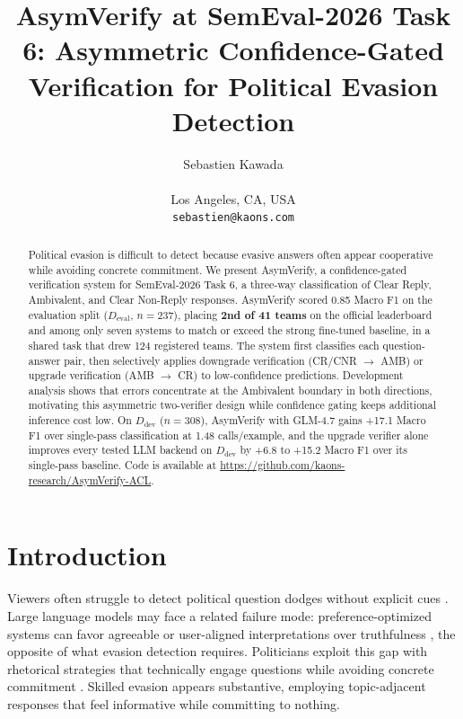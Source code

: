 \documentclass[11pt]{article}
\title{AsymVerify at SemEval-2026 Task 6: Asymmetric Confidence-Gated Verification for Political Evasion Detection}
\author{Sebastien Kawada \\
  \kaonslink \\
  Los Angeles, CA, USA \\
  \texttt{sebastien@kaons.com}}
\newcommand{\rev}[1]{#1}
\begin{document}
\maketitle

\begin{abstract}
\rev{Political evasion is difficult to detect because evasive answers often appear cooperative while avoiding concrete commitment. We present AsymVerify, a confidence-gated verification system for SemEval-2026 Task 6, a three-way classification of Clear Reply, Ambivalent, and Clear Non-Reply responses. AsymVerify scored 0.85 Macro F1 on the evaluation split ($D_{\text{eval}}$, $n{=}237$), placing \textbf{2nd of 41 teams} on the official leaderboard and among only seven systems to match or exceed the strong fine-tuned baseline, in a shared task that drew 124 registered teams. The system first classifies each question-answer pair, then selectively applies downgrade verification (CR/CNR $\rightarrow$ AMB) or upgrade verification (AMB $\rightarrow$ CR) to low-confidence predictions. Development analysis shows that errors concentrate at the Ambivalent boundary in both directions, motivating this asymmetric two-verifier design while confidence gating keeps additional inference cost low. On $D_{\text{dev}}$ ($n{=}308$), AsymVerify with GLM-4.7 gains +17.1 Macro F1 over single-pass classification at 1.48 calls/example, and the upgrade verifier alone improves every tested LLM backend on $D_{\text{dev}}$ by +6.8 to +15.2 Macro F1 over its single-pass baseline. Code is available at \url{https://github.com/kaons-research/AsymVerify-ACL}.}
\end{abstract}

\section{Introduction}

Viewers often struggle to detect political question dodges without explicit cues \citep{clementson2018effects,clementson2018deceptively}. Large language models may face a related failure mode: preference-optimized systems can favor agreeable or user-aligned interpretations over truthfulness \citep{sharma2024sycophancy}, the opposite of what evasion detection requires. Politicians exploit this gap with rhetorical strategies that technically engage questions while avoiding concrete commitment \citep{bull1993how}. Skilled evasion appears substantive, employing topic-adjacent responses that feel informative while committing to nothing.
\end{document}
